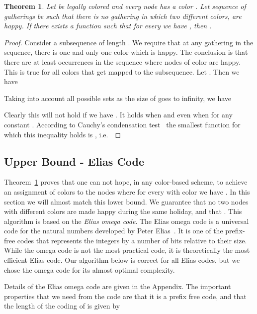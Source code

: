\documentclass[11pt]{article}
\newtheorem{theorem}{Theorem}[section]
\begin{document}
\begin{theorem}\label{t:lowerbound}
Let  be legally colored  and every node  has a color . Let sequence 
of gatherings be such that there is no gathering  in
which two different colors,  are happy. If there exists a function  such that for every  we have , then .
\end{theorem}

\begin{proof}
Consider a subsequence  of length .
We require that at any gathering in the sequence, there is one
and only one color  which is happy. The conclusion
is that there are at least  occurrences in
the sequence where nodes of color  are happy. This is true for all
colors  that get mapped to the subsequence. Let . Then we have

Taking into account all possible sets  as the size of  goes to infinity, we have

Clearly this will not hold if we have . It
holds when  and even when  for any constant . According
to Cauchy's condensation test~\cite{bkk:06} the smallest function for
which this inequality holds is , i.e.\

\end{proof}



\subsection{Upper Bound - Elias Code}\label{ss:elias}

Theorem~\ref{t:lowerbound} proves that one can not hope, in any
color-based scheme, to achieve an assignment of colors to the nodes where for every  with color  we have .
In this section we will almost match this lower bound. We guarantee that no two nodes with
different colors are made happy during the same holiday, and that . This algorithm is based on the {\em Elias omega
  code}. The Elias omega code is a universal code for the natural numbers
developed by Peter Elias~\cite{Elias75}. It is one of the prefix-free
codes that represents the integers by a number of bits relative to their
size. While the omega code is not the most practical code,
it is theoretically the most efficient Elias code. Our algorithm below
is correct for all Elias codes, but we chose the omega code for its
almost optimal complexity.

Details of the Elias omega code are given in the Appendix. The important properties that we need from the code are that it is a prefix free code, and that the length of the coding of  is given by 
\end{document}
